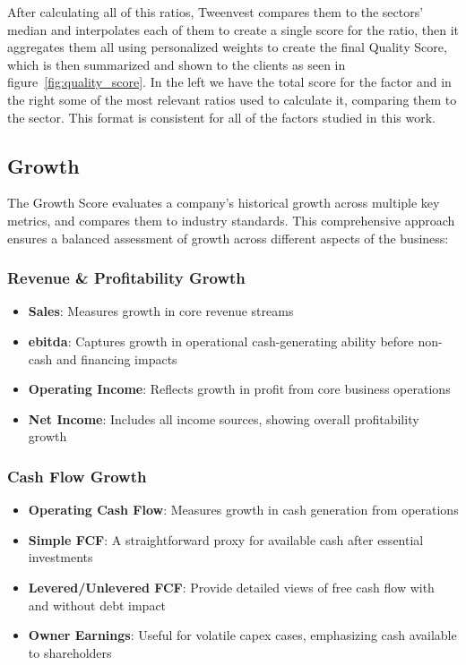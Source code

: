 \documentclass[11pt,english,a4paper,hidelinks]{book}
\begin{document}
\noindent After calculating all of this ratios, Tweenvest compares them to the sectors' median and interpolates each of them to create a single score for the ratio, then it aggregates them all using personalized weights to create the final Quality Score, which is then summarized and shown to the clients as seen in figure~\ref{fig:quality_score}. In the left we have the total score for the factor and in the right some of the most relevant ratios used to calculate it, comparing them to the sector. This format is consistent for all of the factors studied in this work.


\subsection{Growth}
\noindent The Growth Score evaluates a company's historical growth across multiple key metrics, and compares them to industry standards. This comprehensive approach ensures a balanced assessment of growth across different aspects of the business:

\subsubsection{Revenue \& Profitability Growth}
\begin{itemize}
    \item \textbf{Sales}: Measures growth in core revenue streams
    \item \textbf{\acrshort{ebitda}}: Captures growth in operational cash-generating ability before non-cash and financing impacts
    \item \textbf{Operating Income}: Reflects growth in profit from core business operations
    \item \textbf{Net Income}: Includes all income sources, showing overall profitability growth
\end{itemize}

\subsubsection{Cash Flow Growth}
\begin{itemize}
    \item \textbf{Operating Cash Flow}: Measures growth in cash generation from operations
    \item \textbf{Simple FCF}: A straightforward proxy for available cash after essential investments
    \item \textbf{Levered/Unlevered FCF}: Provide detailed views of free cash flow with and without debt impact
    \item \textbf{Owner Earnings}: Useful for volatile \gls{capex} cases, emphasizing cash available to shareholders
\end{itemize}
\end{document}
